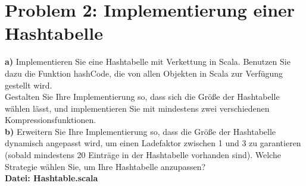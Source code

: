 
\lstset{style=mystyle}

\section*{{Problem 2: Implementierung einer Hashtabelle}} 


\noindent
\textbf{a)} Implementieren Sie eine Hashtabelle mit Verkettung in Scala. Benutzen Sie dazu die Funktion hashCode, die von allen Objekten in Scala zur Verfügung gestellt wird.\\
Gestalten Sie Ihre Implementierung so, dass sich die Größe der Hashtabelle wählen lässt, und implementieren Sie mit mindestens zwei verschiedenen Kompressionsfunktionen.\\

\noindent
\textbf{b)} Erweitern Sie Ihre Implementierung so, dass die Größe der Hashtabelle dynamisch angepasst wird, um einen Ladefaktor zwischen 1 und 3 zu garantieren (sobald mindestens 20 Einträge in der Hashtabelle vorhanden sind). Welche Strategie wählen Sie, um Ihre Hashtabelle anzupassen?\\



\noindent
\textbf{Datei: Hashtable.scala}
